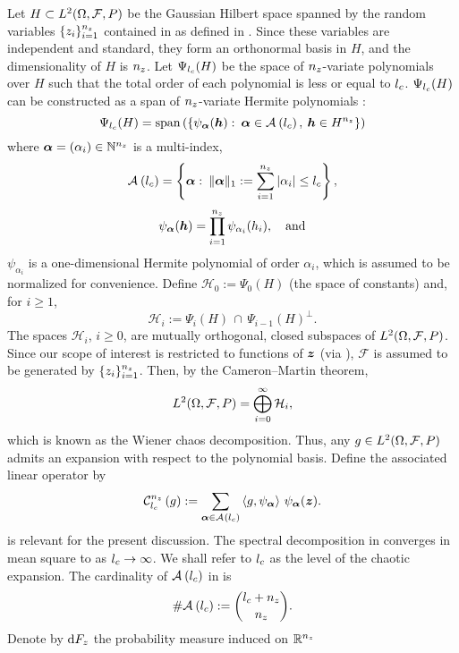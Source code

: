 Let $H \subset \L{2}(\Omega, \mathcal{F}, \probability)$ be the Gaussian Hilbert
space \cite{janson1997} spanned by the random variables $\{ \z_i \}_{i = 1}^\nz$
contained in \vz as defined in . Since these
variables are independent and standard, they form an orthonormal basis in $H$,
and the dimensionality of $H$ is $\nz$. Let $\Psi_\lc(H)$ be the space of
$\nz$-variate polynomials over $H$ such that the total order of each polynomial
is less or equal to $\lc$. $\Psi_\lc(H)$ can be constructed as a span of
$\nz$-variate Hermite polynomials \cite{maitre2010, eldred2008}:
\[
  \Psi_\lc(H) = \mathrm{span}\left(\left\{ \psi_{\multiindex}(\vh): \: \multiindex \in \multiindices{\lc}, \: \vh \in H^\nz \right\}\right)
\]
where $\multiindex = (\alpha_i) \in \natural^\nz$ is a multi-index,
\[
  \multiindices{\lc} = \left\{ \multiindex: \: \norm[1]{\multiindex} := \sum_{i = 1}^\nz |\alpha_i| \leq \lc \right\},
\]
\[
  \psi_{\multiindex}(\vh) = \prod_{i = 1}^\nz \psi_{\alpha_i}(\h_i), \hspace{1em} \text{and}
\]
$\psi_{\alpha_i}$ is a one-dimensional Hermite polynomial of order $\alpha_i$,
which is assumed to be normalized for convenience. Define $\mathcal{H}_0 :=
\Psi_0(H)$ (the space of constants) and, for $i \geq 1$,
\[
  \mathcal{H}_i := \Psi_i(H) \, \cap \, \Psi_{i - 1}(H)^\perp.
\]
The spaces $\mathcal{H}_i$, $i \geq 0$, are mutually orthogonal, closed
subspaces of $\L{2}(\Omega, \mathcal{F}, \probability)$. Since our scope of
interest is restricted to functions of $\vz$ (via
), $\mathcal{F}$ is assumed to be generated by
$\{ \z_i \}_{i = 1}^\nz$. Then, by the Cameron--Martin theorem,
\[
  \L{2}(\Omega, \mathcal{F}, \probability) = \bigoplus_{i = 0}^\infty \mathcal{H}_i,
\]
which is known as the Wiener chaos decomposition. Thus, any $\g \in
\L{2}(\Omega, \mathcal{F}, \probability)$ admits an expansion with
respect to the polynomial basis. Define the associated linear operator by
\[
  \chaos{\nz}{\lc}{\g} := \sum_{\multiindex \in
  \multiindices{\lc}} \innerproduct{\g}{\psi_{\multiindex}} \, \psi_{\multiindex}(\vz).
\]
 is relevant for the present discussion. The spectral
decomposition in  converges in mean square to \g as
$\lc \to \infty$. We shall refer to $\lc$ as the level of the chaotic expansion.
The cardinality of $\multiindices{\lc}$ in
 is
\[
  \cardinality{\multiindices{\lc}} := { \lc + \nz \choose \nz }.
\]
Denote by $\d{F_\z}$ the probability measure induced on $\real^\nz$
